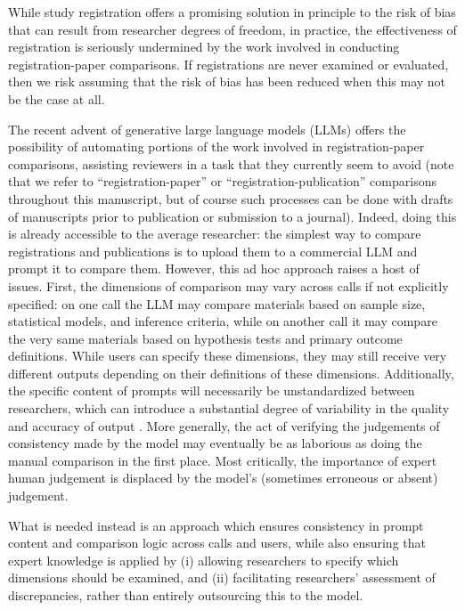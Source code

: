 \documentclass{article}
\begin{document}
While study registration offers a promising solution in principle to the risk of bias that can result from researcher degrees of freedom, in practice, the effectiveness of registration is seriously undermined by the work involved in conducting registration-paper comparisons. If registrations are never examined or evaluated, then we risk assuming that the risk of bias has been reduced when this may not be the case at all.

The recent advent of generative large language models (LLMs) offers the possibility of automating portions of the work involved in registration-paper comparisons, assisting reviewers in a task that they currently seem to avoid (note that we refer to ``registration-paper'' or ``registration-publication'' comparisons throughout this manuscript, but of course such processes can be done with drafts of manuscripts prior to publication or submission to a journal). Indeed, doing this is already accessible to the average researcher: the simplest way to compare registrations and publications is to upload them to a commercial LLM and prompt it to compare them. However, this ad hoc approach raises a host of issues. First, the dimensions of comparison may vary across calls if not explicitly specified: on one call the LLM may compare materials based on sample size, statistical models, and inference criteria, while on another call it may compare the very same materials based on hypothesis tests and primary outcome definitions. While users can specify these dimensions, they may still receive very different outputs depending on their definitions of these dimensions. Additionally, the specific content of prompts will necessarily be unstandardized between researchers, which can introduce a substantial degree of variability in the quality and accuracy of output \citep{cummins_threat_2025,sclar_quantifying_2023}. More generally, the act of verifying the judgements of consistency made by the model may eventually be as laborious as doing the manual comparison in the first place. Most critically, the importance of expert human judgement is displaced by the model's (sometimes erroneous or absent) judgement.

What is needed instead is an approach which ensures consistency in prompt content and comparison logic across calls and users, while also ensuring that expert knowledge is applied by (i) allowing researchers to specify which dimensions should be examined, and (ii) facilitating researchers' assessment of discrepancies, rather than entirely outsourcing this to the model.
\end{document}
